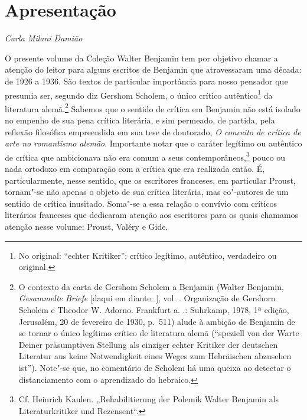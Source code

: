 \chapter*{Apresentação}

\begin{flushright}
{\bigskip\small\itshape\hfill {Carla Milani Damião}}\smallskip
\end{flushright}

O presente volume da Coleção Walter Benjamin tem por objetivo chamar a
atenção do leitor para alguns escritos de Benjamin que atravessaram uma década: de 1926
a 1936. São textos de particular importância para nosso pensador que
presumia ser, segundo diz Gershom Scholem, o único crítico autêntico\footnote{No original: ``echter Kritiker'': crítico legítimo, autêntico, verdadeiro ou original.} da
literatura alemã.\footnote{O contexto da carta de Gershom Scholem a
  Benjamin (Walter Benjamin, \emph{Gesammelte Briefe} [daqui em diante: ], vol. . Organização de Gershorn
  Scholem e Theodor W. Adorno. Frankfurt a. .: Suhrkamp, 1978, 1ª edição, Jerusalém, 20 de fevereiro de 1930, p.~511) alude à ambição de
  Benjamin de se tornar o único legítimo crítico de literatura alemã
  (``speziell von der Warte Deiner präsumptiven Stellung als einziger
      echter Kritiker der deutschen Literatur aus keine Notwendigkeit eines
      Weges zum Hebräischen abzusehen ist''). Note"-se que, no comentário de
  Scholem há uma queixa ao detectar o distanciamento com o aprendizado
  do hebraico.} Sabemos que o sentido de crítica em Benjamin não está
isolado no empenho de sua pena crítica literária, e sim permeado, de
partida, pela reflexão filosófica empreendida em sua tese de doutorado,
\emph{O conceito de crítica de arte no romantismo alemão}. Importante
notar que o caráter legítimo ou autêntico de crítica que ambicionava não era comum a
seus contemporâneos,\footnote{Cf. Heinrich Kaulen. „Rehabilitierung der
  Polemik Walter Benjamin als Literaturkritiker und Rezensent“.} pouco ou nada ortodoxo em comparação com a crítica que
era realizada então. É, particularmente, nesse sentido, que os escritores franceses, em particular Proust, tornam"-se não apenas o objeto de sua crítica literária, mas co"-autores de um sentido de crítica inusitado. Soma"-se a essa relação o convívio com críticos literários franceses que dedicaram atenção aos escritores para os quais chamamos atenção nesse volume: Proust, Valéry e Gide.

